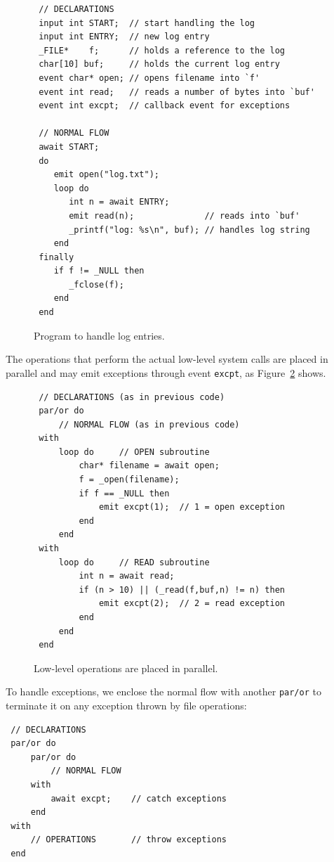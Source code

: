 \documentclass[preprint]{sigplanconf}
\newcommand{\code}[1] {{\small{\texttt{#1}}}}
\newcommand{\1}{\;}
\newcommand{\2}{\;\;}
\newcommand{\3}{\;\;\;}
\newcommand{\5}{\;\;\;\;\;}
\begin{document}
\begin{figure}[t]
{\small
\begin{verbatim}
 // DECLARATIONS
 input int START;  // start handling the log
 input int ENTRY;  // new log entry
 _FILE*    f;      // holds a reference to the log
 char[10] buf;     // holds the current log entry
 event char* open; // opens filename into `f'
 event int read;   // reads a number of bytes into `buf'
 event int excpt;  // callback event for exceptions

 // NORMAL FLOW
 await START;
 do
    emit open("log.txt");
    loop do
       int n = await ENTRY;
       emit read(n);              // reads into `buf'
       _printf("log: %s\n", buf); // handles log string
    end
 finally
    if f != _NULL then
       _fclose(f);
    end
 end
\end{verbatim}
}%
\caption{ Program to handle log entries.
\label{lst:excpt1}
}
\end{figure}

The operations that perform the actual low-level system calls are placed in 
parallel and may emit exceptions through event \code{excpt}, as 
Figure~\ref{lst:excpt2} shows.

\begin{figure}[t]
{\small
\begin{verbatim}
 // DECLARATIONS (as in previous code)
 par/or do
     // NORMAL FLOW (as in previous code)
 with
     loop do     // OPEN subroutine
         char* filename = await open;
         f = _open(filename);
         if f == _NULL then
             emit excpt(1);  // 1 = open exception
         end
     end
 with
     loop do     // READ subroutine
         int n = await read;
         if (n > 10) || (_read(f,buf,n) != n) then
             emit excpt(2);  // 2 = read exception
         end
     end
 end
\end{verbatim}
}%
\caption{ Low-level operations are placed in parallel.
\label{lst:excpt2}
}
\end{figure}

To handle exceptions, we enclose the normal flow with another \code{par/or} to 
terminate it on any exception thrown by file operations:

{\small
\begin{verbatim}
 // DECLARATIONS
 par/or do
     par/or do
         // NORMAL FLOW
     with
         await excpt;    // catch exceptions
     end
 with
     // OPERATIONS       // throw exceptions
 end
\end{verbatim}
}
\end{document}
